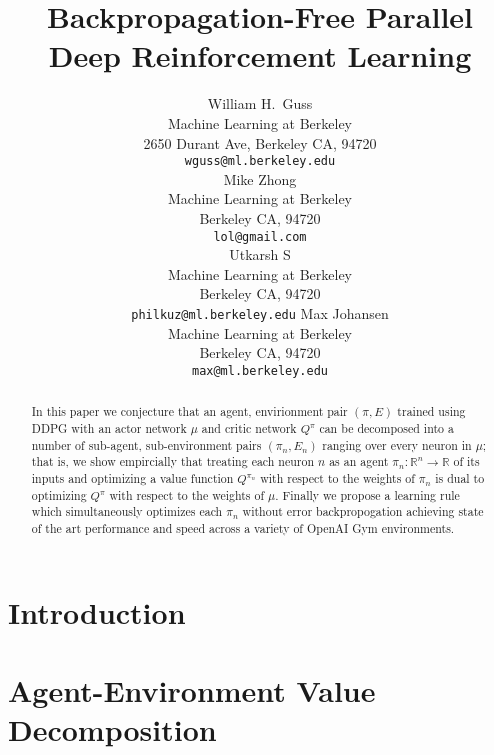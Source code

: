 \documentclass{article} %
\title{Backpropagation-Free Parallel Deep Reinforcement Learning}
\author{
William H.~Guss \\
Machine Learning at Berkeley\\
2650 Durant Ave, Berkeley CA, 94720 \\
\texttt{wguss@ml.berkeley.edu} \\
\And
Mike Zhong \\
Machine Learning at Berkeley \\
Berkeley CA, 94720 \\
\texttt{lol@gmail.com} \\
\And
Utkarsh S \\
Machine Learning at Berkeley \\
Berkeley CA, 94720 \\
\texttt{philkuz@ml.berkeley.edu}
\And
Max Johansen \\
Machine Learning at Berkeley \\
Berkeley CA, 94720 \\
\texttt{max@ml.berkeley.edu}
}
\numberwithin{equation}{subsection}
\numberwithin{theorem}{subsection}
\begin{document}
\maketitle

\begin{abstract}
    In this paper we conjecture that an agent, envirionment pair $(\pi, E)$ trained using DDPG with an actor network $\mu$ and critic network $Q^{\pi}$ can be decomposed into a number of sub-agent, sub-environment pairs  $(\pi_n, E_n)$ ranging over every neuron in $\mu$; that is, we show empircially that treating each neuron $n$ as an agent $\pi_n: \mathbb{R}^n \to \mathbb{R}$ of its inputs and optimizing a value function $Q^{\pi_n}$ with respect to the weights of $\pi_n$ is dual to optimizing $Q^\pi$ with respect to the weights of $\mu$. Finally we propose a learning rule which simultaneously optimizes each $\pi_n$ without error backpropogation achieving state of the art performance and speed across a variety of OpenAI Gym environments.
\end{abstract}
\listoftodos


\section{Introduction}




\section{Agent-Environment Value Decomposition}


\end{document}
